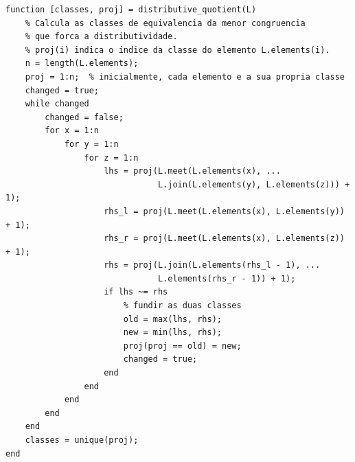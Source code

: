 \begin{lstlisting}[style=matlab, caption={Projeção canónica $q_L: L \to D(L)$ (esquema simplificado)}]
function [classes, proj] = distributive_quotient(L)
    % Calcula as classes de equivalencia da menor congruencia
    % que forca a distributividade.
    % proj(i) indica o indice da classe do elemento L.elements(i).
    n = length(L.elements);
    proj = 1:n;  % inicialmente, cada elemento e a sua propria classe
    changed = true;
    while changed
        changed = false;
        for x = 1:n
            for y = 1:n
                for z = 1:n
                    lhs = proj(L.meet(L.elements(x), ...
                               L.join(L.elements(y), L.elements(z))) + 1);
                    rhs_l = proj(L.meet(L.elements(x), L.elements(y)) + 1);
                    rhs_r = proj(L.meet(L.elements(x), L.elements(z)) + 1);
                    rhs = proj(L.join(L.elements(rhs_l - 1), ...
                               L.elements(rhs_r - 1)) + 1);
                    if lhs ~= rhs
                        % fundir as duas classes
                        old = max(lhs, rhs);
                        new = min(lhs, rhs);
                        proj(proj == old) = new;
                        changed = true;
                    end
                end
            end
        end
    end
    classes = unique(proj);
end
\end{lstlisting}